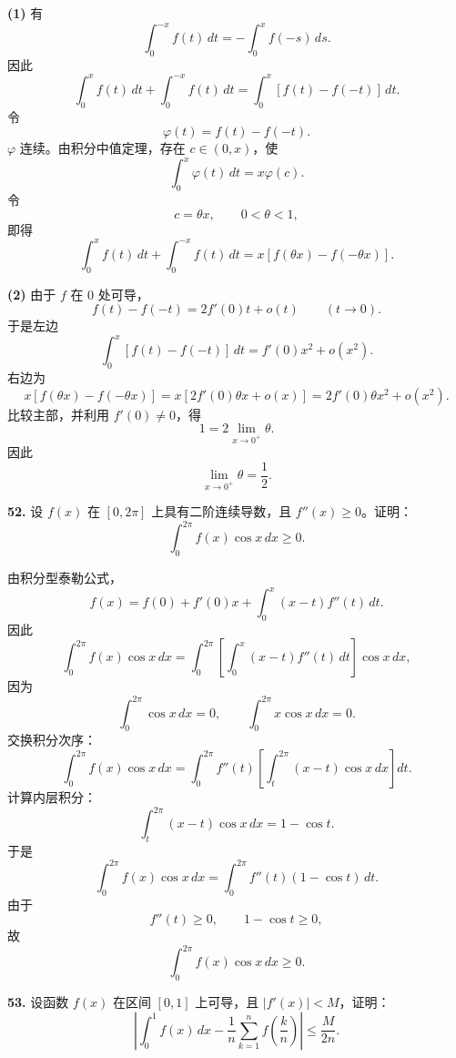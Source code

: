\begin{solutionblock}
\textbf{(1)} 有
\[
\int_0^{-x}f(t)\,dt=-\int_0^x f(-s)\,ds.
\]
因此
\[
\int_0^x f(t)\,dt+\int_0^{-x} f(t)\,dt
=\int_0^x [f(t)-f(-t)]\,dt.
\]
令
\[
\varphi(t)=f(t)-f(-t).
\]
\(\varphi\) 连续。由积分中值定理，存在 \(c\in(0,x)\)，使
\[
\int_0^x\varphi(t)\,dt=x\varphi(c).
\]
令
\[
c=\theta x,\qquad 0<\theta<1,
\]
即得
\[
\int_0^x f(t)\,dt+\int_0^{-x} f(t)\,dt
=x[f(\theta x)-f(-\theta x)].
\]

\textbf{(2)} 由于 \(f\) 在 \(0\) 处可导，
\[
f(t)-f(-t)=2f'(0)t+o(t)\qquad(t\to0).
\]
于是左边
\[
\int_0^x[f(t)-f(-t)]\,dt
=f'(0)x^2+o(x^2).
\]
右边为
\[
x[f(\theta x)-f(-\theta x)]
=x[2f'(0)\theta x+o(x)]
=2f'(0)\theta x^2+o(x^2).
\]
比较主部，并利用 \(f'(0)\ne0\)，得
\[
1=2\lim_{x\to0^+}\theta.
\]
因此
\[
\boxed{\lim_{x\to0^+}\theta=\frac12}.
\]
\end{solutionblock}

\begin{problemblock}
\textbf{52.} 设 \(f(x)\) 在 \([0,2\pi]\) 上具有二阶连续导数，且 \(f''(x)\ge0\)。证明：
\[
\int_0^{2\pi}f(x)\cos x\,dx\ge0.
\]
\end{problemblock}

\begin{solutionblock}
由积分型泰勒公式，
\[
f(x)=f(0)+f'(0)x+\int_0^x(x-t)f''(t)\,dt.
\]
因此
\[
\int_0^{2\pi}f(x)\cos x\,dx
=\int_0^{2\pi}\left[\int_0^x(x-t)f''(t)\,dt\right]\cos x\,dx,
\]
因为
\[
\int_0^{2\pi}\cos x\,dx=0,\qquad
\int_0^{2\pi}x\cos x\,dx=0.
\]
交换积分次序：
\[
\int_0^{2\pi}f(x)\cos x\,dx
=\int_0^{2\pi}f''(t)
\left[\int_t^{2\pi}(x-t)\cos x\,dx\right]dt.
\]
计算内层积分：
\[
\int_t^{2\pi}(x-t)\cos x\,dx
=1-\cos t.
\]
于是
\[
\int_0^{2\pi}f(x)\cos x\,dx
=\int_0^{2\pi}f''(t)(1-\cos t)\,dt.
\]
由于
\[
f''(t)\ge0,\qquad 1-\cos t\ge0,
\]
故
\[
\int_0^{2\pi}f(x)\cos x\,dx\ge0.
\]
\end{solutionblock}

\begin{problemblock}
\textbf{53.} 设函数 \(f(x)\) 在区间 \([0,1]\) 上可导，且 \(|f'(x)|<M\)，证明：
\[
\left|\int_0^1f(x)\,dx-\frac1n\sum_{k=1}^nf\left(\frac{k}{n}\right)\right|
\le\frac{M}{2n}.
\]
\end{problemblock}

